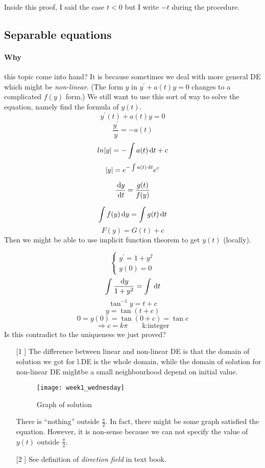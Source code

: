 \begin{remark}Inside this proof, I said the case $t<0$ but I write $-t$ during the procedure.\end{remark}
\subsection{Separable equations}
\paragraph{Why} this topic come into hand?  It is because sometimes we deal with more general DE which might be \emph{non-linear}. (The form $y$ in $y^{\prime}+a(t)y=0$ changes to a complicated $f(y)$ form.) We still want to use this sort of way to solve the equation, namely find the formula of $y(t)$.
\[y^{\prime}(t)+a(t)y=0
\]
\[\frac{y^{\prime}}{y}=-a(t)
\]
\[ln|y|=-\int a(t)\,\mathrm{d} t+c
\]
\[|y|=e^{-\int a(t)\,\mathrm{d} t}e^c
\]
\begin{definition}\[\frac{\,\mathrm{d} y}{\,\mathrm{d} t}=\frac{g(t)}{f(y)}\]
\end{definition}
\[\int f(y)\,\mathrm{d} y=\int g(t)\,\mathrm{d} t
\]
\[F(y)=G(t)+c
\]
Then we might be able to use implicit function theorem to get $y(t)$ (locally).
\begin{example}

\[
\left \{	\begin{gathered}
y^\prime=1+y^2 	\\
y(0)=0
\end{gathered}	\right.
\]
\[\int\frac{\,\mathrm{d} y}{1+y^2}=\int\,\mathrm{d} t
\]
\[\tan^{-1}y=t+c
\]
\[y=\tan(t+c)
\]
\[0=y(0)=\tan(0+c)=\tan c
\]
\[\Rightarrow c=k\pi\qquad\text{k:integer}
\]Is this contradict to the uniqueness we just proved?
\end{example}
\begin{remark}
\begin{itemize}
\item[[1]] The difference between linear and non-linear DE is that the domain of solution we got for l.DE is the whole domain, while the domain of solution for non-linear DE mightbe a small neighbourhood depend on initial value.
\begin{figure}[H]
\centering
\texttt{[image: week1\_wednesday]}
\caption{Graph of solution}
\end{figure}
There is ``nothing'' outside $\frac{\pi}{2}$. In fact, there might be some graph satisfied the equation. However, it is non-sense because we can not specify the value of $y(t)$ outside $\frac{\pi}{2}$.
\item[[2]] See definition of {\it direction field} in text book.

\end{itemize}
\end{remark}
